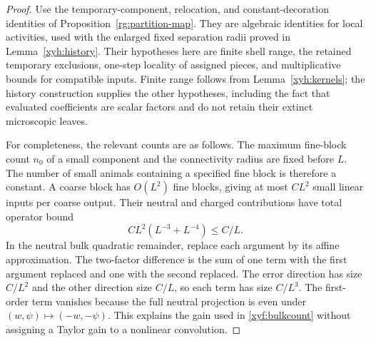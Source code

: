 \begin{proof}
Use the temporary-component, relocation, and constant-decoration
identities of Proposition~\ref{rg:partition-map}.  They are algebraic
identities for local activities, used with the enlarged fixed separation
radii proved in Lemma~\ref{xyh:history}. Their hypotheses here are finite
shell range, the retained temporary exclusions, one-step locality of
assigned pieces, and multiplicative bounds for compatible inputs.
Finite range follows from Lemma~\ref{xyh:kernels}; the history
construction supplies the other hypotheses, including the fact that
evaluated coefficients are scalar factors and do not retain their
extinct microscopic leaves.

For completeness, the relevant counts are as follows.  The maximum
fine-block count \(n_0\) of a small component and the connectivity radius
are fixed before \(L\).  The number of small animals containing a
specified fine block is therefore a constant.  A coarse block has
\(O(L^2)\) fine blocks, giving at most \(CL^2\) small linear inputs per
coarse output.  Their neutral and charged contributions have total
operator bound
\begin{equation}
 C L^2(L^{-3}+L^{-4})\le C/L.
 \label{xyf:bulkcount}
\end{equation}
In the neutral bulk quadratic remainder, replace each argument by its
affine approximation.  The two-factor difference is the sum of one
term with the first argument replaced and one with the second replaced.
The error direction has size \(C/L^2\) and the other direction size
\(C/L\), so each term has size \(C/L^3\).  The first-order term
vanishes because the full neutral projection is even under
\((w,\psi)\mapsto(-w,-\psi)\).  This explains the gain used in
\eqref{xyf:bulkcount} without assigning a Taylor gain to a nonlinear
convolution.


\end{proof}
